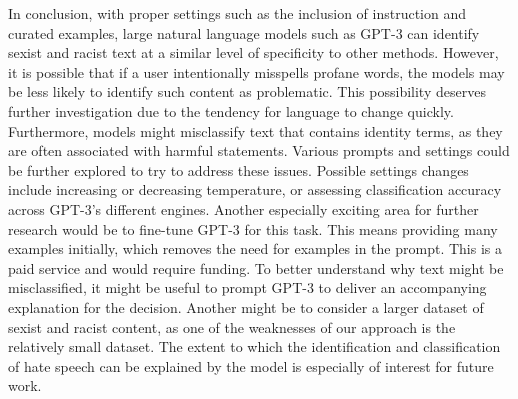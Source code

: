 \documentclass{bmcart}
\begin{document}
In conclusion, with proper settings such as the inclusion of instruction and curated examples, large natural language models such as GPT-3 can identify sexist and racist text at a similar level of specificity to other methods. However, it is possible that if a user intentionally misspells profane words, the models may be less likely to identify such content as problematic. This possibility deserves further investigation due to the tendency for language to change quickly. Furthermore, models might misclassify text that contains identity terms, as they are often associated with harmful statements. Various prompts and settings could be further explored to try to address these issues. Possible settings changes include increasing or decreasing temperature, or assessing classification accuracy across GPT-3's different engines. Another especially exciting area for further research would be to fine-tune GPT-3 for this task. This means providing many examples initially, which removes the need for examples in the prompt. This is a paid service and would require funding. To better understand why text might be misclassified, it might be useful to prompt GPT-3 to deliver an accompanying explanation for the decision. Another might be to consider a larger dataset of sexist and racist content, as one of the weaknesses of our approach is the relatively small dataset. The extent to which the identification and classification of hate speech can be explained by the model is especially of interest for future work.


\end{document}
